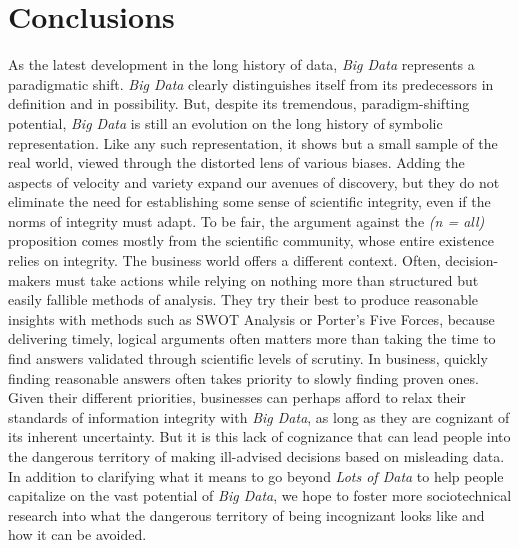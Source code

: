 \documentclass[sigconf]{acmart}
\begin{document}
\section{Conclusions}
As the latest development in the long history of data, {\em Big Data} represents a paradigmatic shift. {\em Big Data} clearly distinguishes itself from its predecessors in definition and in possibility. But, despite its tremendous, paradigm-shifting potential, {\em Big Data} is still an evolution on the long history of symbolic representation. Like any such representation, it shows but a small sample of the real world, viewed through the distorted lens of various biases. Adding the aspects of velocity and variety expand our avenues of discovery, but they do not eliminate the need for establishing some sense of scientific integrity, even if the norms of integrity must adapt. To be fair, the argument against the {\em (n = all)} proposition comes mostly from the scientific community, whose entire existence relies on integrity. The business world offers a different context. Often, decision-makers must take actions while relying on nothing more than structured but easily fallible methods of analysis.\cite{Keystone} They try their best to produce reasonable insights with methods such as SWOT Analysis or Porter's Five Forces, because delivering timely, logical arguments often matters more than taking the time to find answers validated through scientific levels of scrutiny. In business, quickly finding reasonable answers often takes priority to slowly finding proven ones. Given their different priorities, businesses can perhaps afford to relax their standards of information integrity with {\em Big Data}, as long as they are cognizant of its inherent uncertainty. But it is this lack of cognizance that can lead people into the dangerous territory of making ill-advised decisions based on misleading data. In addition to clarifying what it means to go beyond {\em Lots of Data} to help people capitalize on the vast potential of {\em Big Data}, we hope to foster more sociotechnical research into what the dangerous territory of being incognizant looks like and how it can be avoided.





 


\end{document}
